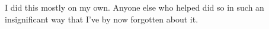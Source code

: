 
\begin{acknowledgements}

I did this mostly on my own.
Anyone else who helped did so in such an insignificant way that I've 
by now forgotten about it.
\end{acknowledgements}



